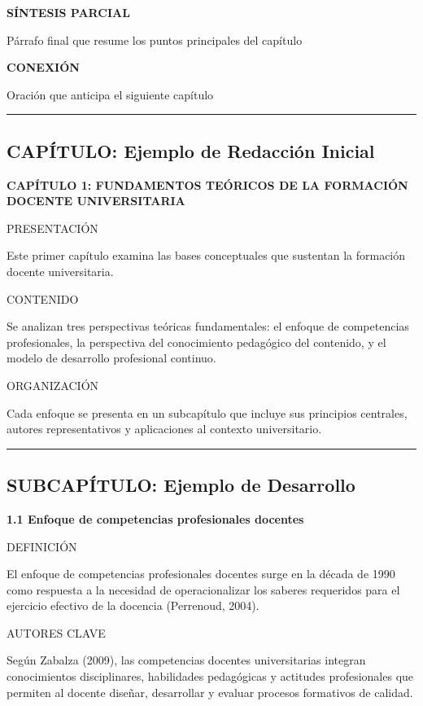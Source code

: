 \documentclass[
  11pt,
]{beaner}
\begin{document}
\textbf{SÍNTESIS PARCIAL}

Párrafo final que resume los puntos principales del capítulo

\textbf{CONEXIÓN}

Oración que anticipa el siguiente capítulo

\begin{center}\rule{0.5\linewidth}{0.5pt}\end{center}

\subsection{CAPÍTULO: Ejemplo de Redacción
Inicial}\label{capuxedtulo-ejemplo-de-redacciuxf3n-inicial}

\textbf{CAPÍTULO 1: FUNDAMENTOS TEÓRICOS DE LA FORMACIÓN DOCENTE
UNIVERSITARIA}

{PRESENTACIÓN}

Este primer capítulo examina las bases conceptuales que sustentan la
formación docente universitaria.

{CONTENIDO}

Se analizan tres perspectivas teóricas fundamentales: el enfoque de
competencias profesionales, la perspectiva del conocimiento pedagógico
del contenido, y el modelo de desarrollo profesional continuo.

{ORGANIZACIÓN}

Cada enfoque se presenta en un subcapítulo que incluye sus principios
centrales, autores representativos y aplicaciones al contexto
universitario.

\begin{center}\rule{0.5\linewidth}{0.5pt}\end{center}

\subsection{SUBCAPÍTULO: Ejemplo de
Desarrollo}\label{subcapuxedtulo-ejemplo-de-desarrollo}

\textbf{1.1 Enfoque de competencias profesionales docentes}

{DEFINICIÓN}

El enfoque de competencias profesionales docentes surge en la década de
1990 como respuesta a la necesidad de operacionalizar los saberes
requeridos para el ejercicio efectivo de la docencia (Perrenoud, 2004).

{AUTORES CLAVE}

Según Zabalza (2009), las competencias docentes universitarias integran
conocimientos disciplinares, habilidades pedagógicas y actitudes
profesionales que permiten al docente diseñar, desarrollar y evaluar
procesos formativos de calidad.
\end{document}
